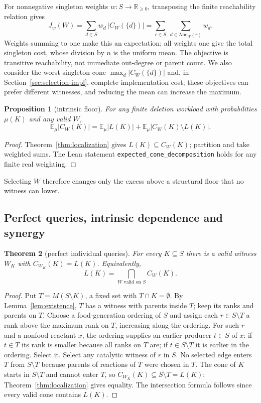 \documentclass[11pt,a4paper]{article}
\theoremstyle{plain}
\newtheorem{theorem}{Theorem}[section]
\newtheorem{proposition}[theorem]{Proposition}
\theoremstyle{definition}
\theoremstyle{remark}
\newcommand{\R}{\mathbb{R}}
\newcommand{\E}{\mathbb{E}}
\newcommand{\Anc}{\mathrm{Anc}}
\newcommand{\lean}[1]{\texttt{#1}}
\begin{document}
For nonnegative singleton weights $w:S\to\R_{\ge0}$, transposing the finite reachability relation gives
\begin{equation}\label{eq:objective}
J_w(W)=\sum_{d\in S}w_d\,|C_W(\{d\})|=\sum_{r\in S}\ \sum_{d\in\Anc_W(r)}w_d .
\end{equation}
Weights summing to one make this an expectation; all weights one give the total singleton cost, whose division by $n$ is the uniform mean. The objective is transitive reachability, not immediate out-degree or parent count. We also consider the worst singleton cone $\max_{d}|C_W(\{d\})|$ and, in Section~\ref{sec:selection-impl}, complete implementation cost; these objectives can prefer different witnesses, and reducing the mean can increase the maximum.

\begin{proposition}[intrinsic floor]\label{prop:floor}
For any finite deletion workload with probabilities $\mu(K)$ and any valid $W$,
\[
\E_\mu|C_W(K)|=\E_\mu|L(K)|+\E_\mu|C_W(K)\setminus L(K)|.
\]
\end{proposition}

\begin{proof}
Theorem~\ref{thm:localization} gives $L(K)\subseteq C_W(K)$; partition and take weighted sums. The Lean statement \lean{expected\_cone\_decomposition} holds for any finite real weighting.
\end{proof}

Selecting $W$ therefore changes only the excess above a structural floor that no witness can lower.

\subsection{Perfect queries, intrinsic dependence and synergy}

\begin{theorem}[perfect individual queries]\label{thm:perfect}
For every $K\subseteq S$ there is a valid witness $W_K$ with $C_{W_K}(K)=L(K)$. Equivalently,
\[
L(K)=\bigcap_{W\text{ valid on }S}C_W(K).
\]
\end{theorem}

\begin{proof}
Put $T=M(S\setminus K)$, a fixed set with $T\cap K=\emptyset$. By Lemma~\ref{lem:existence}, $T$ has a witness with parents inside $T$; keep its ranks and parents on $T$. Choose a food-generation ordering of $S$ and assign each $r\in S\setminus T$ a rank above the maximum rank on $T$, increasing along the ordering. For such $r$ and a nonfood reactant $x$, the ordering supplies an earlier producer $t\in S$ of $x$: if $t\in T$ its rank is smaller because all ranks on $T$ are; if $t\in S\setminus T$ it is earlier in the ordering. Select it. Select any catalytic witness of $r$ in $S$. No selected edge enters $T$ from $S\setminus T$ because parents of reactions of $T$ were chosen in $T$. The cone of $K$ starts in $S\setminus T$ and cannot enter $T$, so $C_{W_K}(K)\subseteq S\setminus T=L(K)$; Theorem~\ref{thm:localization} gives equality. The intersection formula follows since every valid cone contains $L(K)$.
\end{proof}
\end{document}
